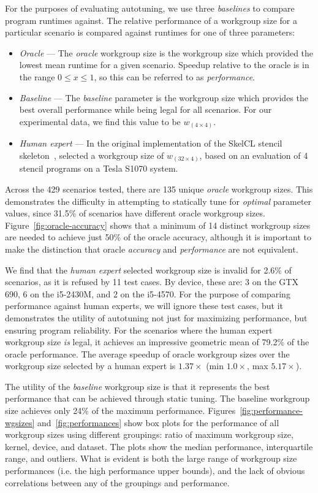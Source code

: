 \documentclass[nonatbib,preprint,nocopyrightspace,9pt]{sigplanconf}
\begin{document}
For the purposes of evaluating autotuning, we use three
\emph{baselines} to compare program runtimes against. The relative
performance of a workgroup size for a particular scenario is compared
against runtimes for one of three parameters:
%
\begin{itemize}
\item \emph{Oracle} --- The \emph{oracle} workgroup size is the
  workgroup size which provided the lowest mean runtime for a given
  scenario. Speedup relative to the oracle is in the range
  $0 \le x \le 1$, so this can be referred to as \emph{performance}.
\item \emph{Baseline} --- The \emph{baseline} parameter is the
  workgroup size which provides the best overall performance while
  being legal for all scenarios. For our experimental data, we find
  this value to be $w_{(4 \times 4)}$.
\item \emph{Human expert} --- In the original implementation of the
  SkelCL stencil skeleton~\cite{Steuwer2014a},
  \citeauthor{Steuwer2014a} selected a workgroup size of
  $w_{(32 \times 4)}$, based on an evaluation of 4 stencil programs on
  a Tesla S1070 system.
\end{itemize}
%
Across the 429 scenarios tested, there are 135 unique \emph{oracle}
workgroup sizes. This demonstrates the difficulty in attempting to
statically tune for \emph{optimal} parameter values, since 31.5\% of
scenarios have different oracle workgroup
sizes. Figure~\ref{fig:oracle-accuracy} shows that a minimum of 14
distinct workgroup sizes are needed to achieve just 50\% of the oracle
accuracy, although it is important to make the distinction that oracle
\emph{accuracy} and \emph{performance} are not equivalent.

We find that the \emph{human expert} selected workgroup size is
invalid for 2.6\% of scenarios, as it is refused by 11 test cases. By
device, these are: 3 on the GTX 690, 6 on the i5-2430M, and 2 on the
i5-4570. For the purpose of comparing performance against human
experts, we will ignore these test cases, but it demonstrates the
utility of autotuning not just for maximizing performance, but
ensuring program reliability. For the scenarios where the human expert
workgroup size \emph{is} legal, it achieves an impressive geometric
mean of 79.2\% of the oracle performance. The average speedup of
oracle workgroup sizes over the workgroup size selected by a human
expert is $1.37\times$ (min $1.0\times$, max $5.17\times$).

The utility of the \emph{baseline} workgroup size is that it
represents the best performance that can be achieved through static
tuning. The baseline workgroup size achieves only 24\% of the maximum
performance. Figures~\ref{fig:performance-wgsizes}
and~\ref{fig:performances} show box plots for the performance of all
workgroup sizes using different groupings: ratio of maximum workgroup
size, kernel, device, and dataset. The plots show the median
performance, interquartile range, and outliers. What is evident is
both the large range of workgroup size performances (i.e. the high
performance upper bounds), and the lack of obvious correlations
between any of the groupings and performance.
\end{document}
